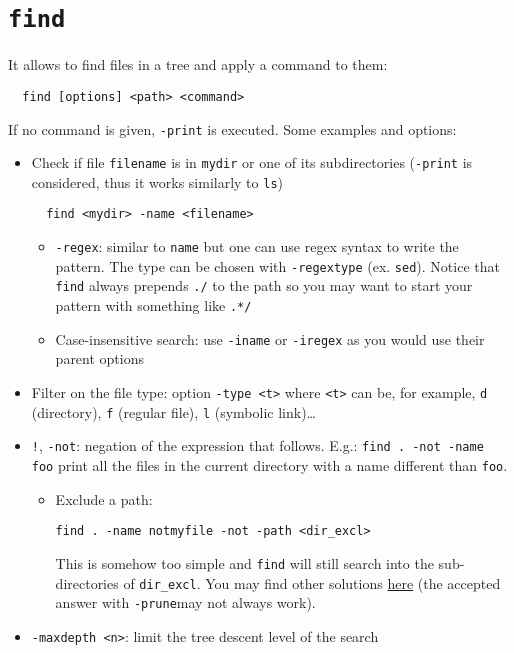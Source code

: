 \documentclass[a4paper,12pt,%
              final%
              ]{article}
\begin{document}
\section{\texttt{find}}
It allows to find files in a tree and apply a command to them:
\begin{verbatim}
  find [options] <path> <command>
\end{verbatim}
If no command is given, \texttt{-print} is executed. Some examples and options:
\begin{itemize}
  \item Check if file \texttt{filename} is in \texttt{mydir} or one of its subdirectories (\texttt{-print} is considered, thus it works similarly to \texttt{ls})
\begin{verbatim}
  find <mydir> -name <filename>
\end{verbatim}
  \begin{itemize}
    \item \verb|-regex|: similar to \texttt{name} but one can use regex syntax to write the pattern. The type can be chosen with \verb|-regextype| (ex. \texttt{sed}). Notice that \texttt{find} always prepends \verb|./| to the path so you may want to start your pattern with something like \verb|.*/|
    \item Case-insensitive search: use \verb|-iname| or \verb|-iregex| as you would use their parent options
  \end{itemize}
  \item Filter on the file type: option \verb|-type <t>| where \texttt{<t>} can be, for example, \texttt{d} (directory), \texttt{f} (regular file), \texttt{l} (symbolic link)\dots
  \item \texttt{!}, \texttt{-not}: negation of the expression that follows. E.g.: \texttt{find . -not -name foo} print all the files in the current directory with a name different than \texttt{foo}.
    \begin{itemize}
      \item Exclude a path:
\begin{verbatim}
find . -name notmyfile -not -path <dir_excl>
\end{verbatim}
        This is somehow too simple and \texttt{find} will still search into the sub-directories of \verb|dir_excl|. You may find other solutions \href{https://stackoverflow.com/questions/4210042/how-to-exclude-a-directory-in-find-command}{here} (the accepted answer with \verb|-prune|may not always work).
    \end{itemize}
  \item \verb|-maxdepth <n>|: limit the tree descent level of the search

\end{itemize}
\end{document}

